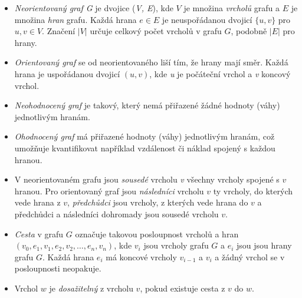\documentclass[12pt]{report}			%
\begin{document}
			\begin{itemize}
				\item \emph{Neorientovaný graf G} je dvojice (\emph{V, E}), kde $V$ je množina \emph{vrcholů} grafu a $E$ je množina \emph{hran} grafu. Každá hrana $e \in E$ je neuspořádanou dvojicí $\{u,v\}$ pro $u,v \in V$. Značení $|V|$ určuje celkový počet vrcholů v grafu $G$, podobně $|E|$ pro hrany.
				
				\item \emph{Orientovaný graf} se od neorientovaného liší tím, že hrany mají směr. Každá hrana je uspořádanou dvojicí $(u, v)$, kde \emph{u} je počáteční vrchol a \emph{v} koncový vrchol.
				
				\item \emph{Neohodnocený graf} je takový, který nemá přiřazené žádné hodnoty (váhy) jednotlivým hranám.

				\item \emph{Ohodnocený graf} má přiřazené hodnoty (váhy) jednotlivým hranám, což umožňuje kvantifikovat například vzdálenost či náklad spojený s každou hranou.
				
				\item V neorientovaném grafu jsou \emph{sousedé} vrcholu \emph{v} všechny vrcholy spojené s $v$ hranou. Pro orientovaný graf jsou \emph{následníci} vrcholu $v$ ty vrcholy, do kterých vede hrana z $v$, \emph{předchůdci} jsou vrcholy, z kterých vede hrana do $v$ a předchůdci a následníci dohromady jsou sousedé vrcholu $v$.
				\item \emph{Cesta} v grafu $G$ označuje takovou posloupnost vrcholů a hran \\$(v_0,e_1,v_1,e_2,v_2,\dots, e_n,v_n)$, kde $v_i$ jsou vrcholy grafu $G$ a $e_i$ jsou jsou hrany grafu $G$. Každá hrana $e_i$ má koncové vrcholy $v_{i-1}$ a $v_i$ a žádný vrchol se v posloupnosti neopakuje. 
				\item Vrchol $w$ je \emph{dosažitelný} z vrcholu $v$, pokud existuje cesta z $v$ do $w$.
			\end{itemize}
			
\end{document}

